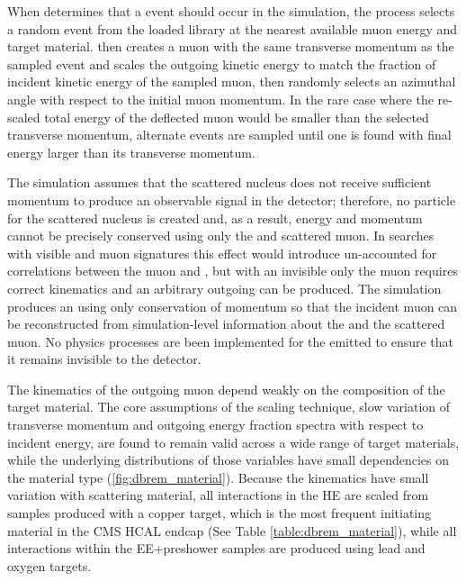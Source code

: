 When \gf determines that a \dbrem event should occur in the simulation, the process selects a random event from the loaded \mg library at the nearest available muon energy and target material. 
\gf then creates a muon with the same transverse momentum as the sampled event and scales the outgoing kinetic energy to match the fraction of incident kinetic energy of the sampled muon, then randomly selects an azimuthal angle with respect to the initial muon momentum. 
In the rare case where the re-scaled total energy of the deflected muon would be smaller than the selected transverse momentum, alternate events are sampled until one is found with final energy larger than its transverse momentum. 

The simulation assumes that the scattered nucleus does not receive sufficient momentum to produce an observable signal in the detector; therefore, no \gf particle for the scattered nucleus is created and, as a result, energy and momentum cannot be precisely conserved using only the \aprime and scattered muon. 
In searches with visible \aprime and muon signatures this effect would introduce un-accounted for correlations between the muon and \aprime, but with an invisible \aprime only the muon requires correct kinematics and an arbitrary outgoing \aprime can be produced.  
The simulation produces an \aprime using only conservation of momentum so that the incident muon can be reconstructed from simulation-level information about the \aprime and the scattered muon.
No physics processes are been implemented for the emitted \aprime to ensure that it remains invisible to the detector.

The kinematics of the outgoing muon depend weakly on the composition of the target material.
The core assumptions of the scaling technique, slow variation of transverse momentum and outgoing energy fraction spectra with respect to incident energy, are found to remain valid across a wide range of target materials, while the underlying distributions of those variables have small dependencies on the material type (\cref{fig:dbrem_material}).
Because the kinematics have small variation with scattering material, all \dbrem interactions in the HE are scaled from samples produced with a copper target, which is the most frequent \dbrem initiating material in the CMS HCAL endcap (See Table \ref{table:dbrem_material}), while all interactions within the EE+preshower samples are produced using lead and oxygen targets.

